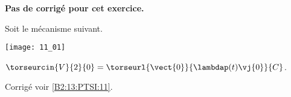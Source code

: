 \normaltrue \difficilefalse \tdifficilefalse
\correctionfalse


\setcounter{numques}{0}
\ifcorrection
\else
\textbf{Pas de corrigé pour cet exercice.}
\fi

\ifprof
\else
Soit le mécanisme suivant. 
\begin{center}
\texttt{[image: 11\_01]}
\end{center}
\fi


\ifprof
$\torseurcin{V}{2}{0} = \torseurl{\vect{0}}{\lambdap (t)\vj{0}}{C}$.
\else
\fi



\ifprof
\else
\footnotesize
\ifcolle
\else

\fi
\normalsize
\begin{flushright}
\footnotesize{Corrigé  voir \ref{B2:13:PTSI:11}.}
\end{flushright}%
\fi